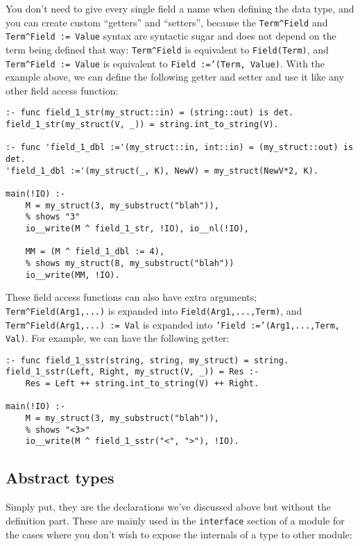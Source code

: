   You don't need to give every single field a name when defining the data type, and you can create custom ``getters'' and ``setters'', because the \texttt{Term\;\textasciicircum\;Field} and \texttt{Term\;\textasciicircum\;Field := Value} syntax are syntactic sugar and does not depend on the term being defined that way: \texttt{Term\;\textasciicircum\;Field} is equivalent to \texttt{Field(Term)}, and \texttt{Term\;\textasciicircum\;Field := Value} is equivalent to \texttt{Field :='(Term, Value)}. With the example above, we can define the following getter and setter and use it like any other field access function:

\begin{lstlisting}[language=Mercury]
:- func field_1_str(my_struct::in) = (string::out) is det.
field_1_str(my_struct(V, _)) = string.int_to_string(V).

:- func 'field_1_dbl :='(my_struct::in, int::in) = (my_struct::out) is det.
'field_1_dbl :='(my_struct(_, K), NewV) = my_struct(NewV*2, K).

main(!IO) :-
	M = my_struct(3, my_substruct("blah")),
    % shows "3"
	io__write(M ^ field_1_str, !IO), io__nl(!IO),

	MM = (M ^ field_1_dbl := 4),
    % shows my_struct(8, my_substruct("blah"))
	io__write(MM, !IO).
\end{lstlisting}

  These field access functions can also have extra arguments; \texttt{Term\;\textasciicircum\;Field(Arg1,...)} is expanded into \texttt{Field(Arg1,...,Term)}, and  \texttt{Term\;\textasciicircum\;Field(Arg1,...) := Val} is expanded into \texttt{'Field :='(Arg1,...,Term, Val)}. For example, we can have the following getter:

\begin{lstlisting}[language=Mercury]
:- func field_1_sstr(string, string, my_struct) = string.
field_1_sstr(Left, Right, my_struct(V, _)) = Res :-
    Res = Left ++ string.int_to_string(V) ++ Right.

main(!IO) :-
	M = my_struct(3, my_substruct("blah")),
    % shows "<3>"
	io__write(M ^ field_1_sstr("<", ">"), !IO).
\end{lstlisting}
  
    
\subsection{Abstract types}

Simply put, they are the declarations we've discussed above but without the definition part. These are mainly used in the \texttt{interface} section of a module for the cases where you don't wish to expose the internals of a type to other module:


